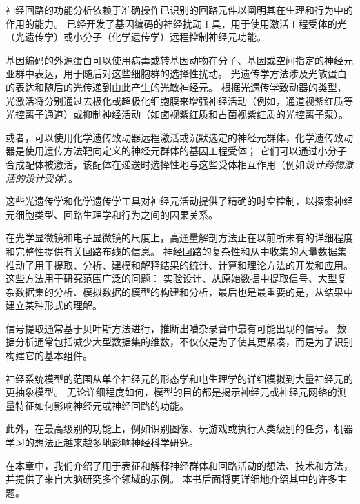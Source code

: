 \begin{proposition}[神经元活动的光遗传学和化学遗传学操作] \label{box:5_2}
	
	\quad \quad 神经回路的功能分析依赖于准确操作已识别的回路元件以阐明其在生理和行为中的作用的能力。
	已经开发了基因编码的神经扰动工具，用于使用激活工程受体的光（光遗传学）或小分子（化学遗传学）远程控制神经元功能。
	
	\quad \quad 基因编码的外源蛋白可以使用病毒或转基因动物在分子、基因或空间指定的神经元亚群中表达，用于随后对这些细胞群的选择性扰动。
	光遗传学方法涉及光敏蛋白的表达和随后的光传递到由此产生的光敏神经元。
	根据光遗传学致动器的类型，光激活将分别通过去极化或超极化细胞膜来增强神经活动（例如，通道视紫红质等光控离子通道）或抑制神经活动（如卤视紫红质和古菌视紫红质的光控离子泵）。
	
	\quad \quad 或者，可以使用化学遗传致动器远程激活或沉默选定的神经元群体，化学遗传致动器是使用遗传方法靶向定义的神经元群体的基因工程受体；
	它们可以通过小分子合成配体被激活，该配体在递送时选择性地与这些受体相互作用（例如\textit{设计药物激活的设计受体}）。
	
	\quad \quad 这些光遗传学和化学遗传学工具对神经元活动提供了精确的时空控制，以探索神经元细胞类型、回路生理学和行为之间的因果关系。
	
\end{proposition}



在光学显微镜和电子显微镜的尺度上，高通量解剖方法正在以前所未有的详细程度和完整性提供有关回路布线的信息。
神经回路的复杂性和从中收集的大量数据集推动了用于提取、分析、建模和解释结果的统计、计算和理论方法的开发和应用。
这些方法用于研究范围广泛的问题：
实验设计、从原始数据中提取信号、大型复杂数据集的分析、模拟数据的模型的构建和分析，最后也是最重要的是，从结果中建立某种形式的理解。


信号提取通常基于贝叶斯方法进行，推断出嘈杂录音中最有可能出现的信号。
数据分析通常包括减少大型数据集的维数，不仅仅是为了使其更紧凑，而是为了识别构建它的基本组件。


神经系统模型的范围从单个神经元的形态学和电生理学的详细模拟到大量神经元的更抽象模型。
无论详细程度如何，模型的目的都是揭示神经元或神经元网络的测量特征如何影响神经元或神经回路的功能。


此外，在最高级别的功能上，例如识别图像、玩游戏或执行人类级别的任务，机器学习的想法正越来越多地影响神经科学研究。


在本章中，我们介绍了用于表征和解释神经群体和回路活动的想法、技术和方法，并提供了来自大脑研究多个领域的示例。
本书后面将更详细地介绍其中的许多主题。



